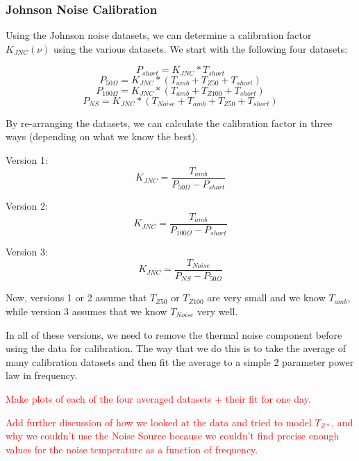 \subsubsection{Johnson Noise Calibration}

Using the Johnson noise datasets, we can determine a calibration factor $K_{JNC}(\nu)$ using the various datasets. We start with the following four datasets:

\begin{equation}
P_{short} = K_{JNC}*T_{short}
\end{equation}
\begin{equation}
P_{50 \Omega} = K_{JNC}*(T_{amb} + T_{Z50} + T_{short})
\end{equation}
\begin{equation}
P_{100 \Omega} = K_{JNC}*(T_{amb} + T_{Z100}+T_{short})
\end{equation}
\begin{equation}
P_{NS} = K_{JNC}*(T_{Noise}+T_{amb}+T_{Z50}+T_{short})
\end{equation}

By re-arranging the datasets, we can calculate the calibration factor in three ways (depending on what we know the best). 

Version 1:
\begin{equation}
K_{JNC} = \frac{T_{amb}}{P_{50 \Omega} - P_{short}}
\end{equation}

Version 2:
\begin{equation}
K_{JNC} = \frac{T_{amb}}{P_{100 \Omega} - P_{short}}
\end{equation}

Version 3:
\begin{equation}
K_{JNC} = \frac{T_{Noise}}{P_{NS}-P_{50 \Omega}}
\end{equation}

Now, versions 1 or 2 assume that $T_{Z50}$ or $T_{Z100}$ are very small and we know $T_{amb}$, while version 3 assumes that we know $T_{Noise}$ very well.

In all of these versions, we need to remove the thermal noise component before using the data for calibration. The way that we do this is to take the average of many calibration datasets and then fit the average to a simple 2 parameter power law in frequency. 

\textcolor{red}{Make plots of each of the four averaged datasets + their fit for one day.}

\textcolor{red}{Add further discussion of how we looked at the data and tried to model $T_{Z*}$, and why we couldn't use the Noise Source because we couldn't find precise enough values for the noise temperature as a function of frequency.}

